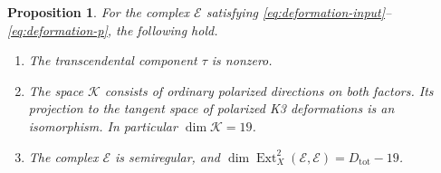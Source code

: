 \documentclass[11pt]{article}
\numberwithin{equation}{section}
\newtheorem{proposition}[theorem]{Proposition}
\theoremstyle{definition}
\theoremstyle{remark}
\newcommand{\Ext}{\operatorname{Ext}}
\begin{document}
\begin{proposition}\label{prop:deformation-rank}
For the complex $\mathcal E$ satisfying
\eqref{eq:deformation-input}--\eqref{eq:deformation-p}, the following
hold.
\begin{enumerate}
\item The transcendental component $\tau$ is nonzero.
\item The space $\mathcal K$ consists of ordinary polarized directions on
both factors. Its projection to the tangent space of polarized K3
deformations is an isomorphism. In particular $\dim \mathcal K=19$.
\item The complex $\mathcal E$ is semiregular, and
$\dim\Ext^2_X(\mathcal E,\mathcal E)=D_{\mathrm{tot}}-19$.
\end{enumerate}
\end{proposition}
\end{document}
